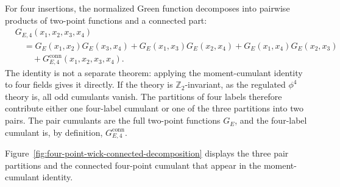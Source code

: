 \begin{remark}
\label{rem:four-point-moment-cumulant-decomposition}
For four insertions, the normalized Green function decomposes into pairwise
products of two-point functions and a connected part:
\[
\begin{aligned}
  &G_{E,4}(x_1,x_2,x_3,x_4)
  \\
  &\quad =
  G_E(x_1,x_2)G_E(x_3,x_4)
  +G_E(x_1,x_3)G_E(x_2,x_4)
  +G_E(x_1,x_4)G_E(x_2,x_3)
  \\
  &\qquad
  +G_{E,4}^{\mathrm{conn}}(x_1,x_2,x_3,x_4).
\end{aligned}
\]
The identity is not a separate theorem: applying the moment-cumulant identity
to four fields gives it directly.  If the theory is
\(\mathbb Z_2\)-invariant, as the regulated \(\phi^4\) theory is, all odd
cumulants vanish.  The partitions of four labels therefore contribute either
one four-label cumulant or one of the three partitions into two pairs.  The
pair cumulants are the full two-point functions \(G_E\), and the four-label
cumulant is, by definition, \(G_{E,4}^{\mathrm{conn}}\).
\end{remark}

Figure~\ref{fig:four-point-wick-connected-decomposition} displays the three pair
partitions and the connected four-point cumulant that appear in the
moment-cumulant identity.

